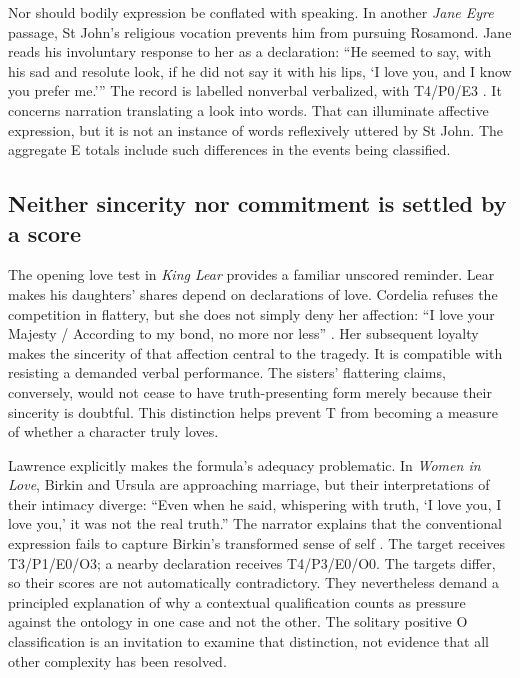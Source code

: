 \documentclass[11pt,a4paper]{article}
\begin{document}
Nor should bodily expression be conflated with speaking. In another \emph{Jane Eyre} passage, St John's religious vocation prevents him from pursuing Rosamond. Jane reads his involuntary response to her as a declaration: “He seemed to say, with his sad and resolute look, if he did not say it with his lips, ‘I love you, and I know you prefer me.’” The record is labelled nonverbal verbalized, with T4/P0/E3 \citep[chap.~XXXII]{bronteJaneEyre}. It concerns narration translating a look into words. That can illuminate affective expression, but it is not an instance of words reflexively uttered by St John. The aggregate E totals include such differences in the events being classified.

\subsection{Neither sincerity nor commitment is settled by a score}

The opening love test in \emph{King Lear} provides a familiar unscored reminder. Lear makes his daughters' shares depend on declarations of love. Cordelia refuses the competition in flattery, but she does not simply deny her affection: “I love your Majesty / According to my bond, no more nor less” \citep[1.1]{shakespeareLear}. Her subsequent loyalty makes the sincerity of that affection central to the tragedy. It is compatible with resisting a demanded verbal performance. The sisters' flattering claims, conversely, would not cease to have truth-presenting form merely because their sincerity is doubtful. This distinction helps prevent T from becoming a measure of whether a character truly loves.

Lawrence explicitly makes the formula's adequacy problematic. In \emph{Women in Love}, Birkin and Ursula are approaching marriage, but their interpretations of their intimacy diverge: “Even when he said, whispering with truth, ‘I love you, I love you,’ it was not the real truth.” The narrator explains that the conventional expression fails to capture Birkin's transformed sense of self \citep[chap.~XXVII]{lawrenceWomenInLove}. The target receives T3/P1/E0/O3; a nearby declaration receives T4/P3/E0/O0. The targets differ, so their scores are not automatically contradictory. They nevertheless demand a principled explanation of why a contextual qualification counts as pressure against the ontology in one case and not the other. The solitary positive O classification is an invitation to examine that distinction, not evidence that all other complexity has been resolved.
\end{document}
